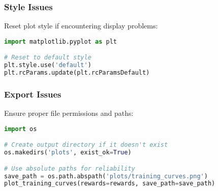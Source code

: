 \subsubsection{Style Issues}

Reset plot style if encountering display problems:

\begin{lstlisting}[language=python, caption=Style Reset]
import matplotlib.pyplot as plt

# Reset to default style
plt.style.use('default')
plt.rcParams.update(plt.rcParamsDefault)
\end{lstlisting}

\subsubsection{Export Issues}

Ensure proper file permissions and paths:

\begin{lstlisting}[language=python, caption=Export Troubleshooting]
import os

# Create output directory if it doesn't exist
os.makedirs('plots', exist_ok=True)

# Use absolute paths for reliability
save_path = os.path.abspath('plots/training_curves.png')
plot_training_curves(rewards=rewards, save_path=save_path)
\end{lstlisting} 